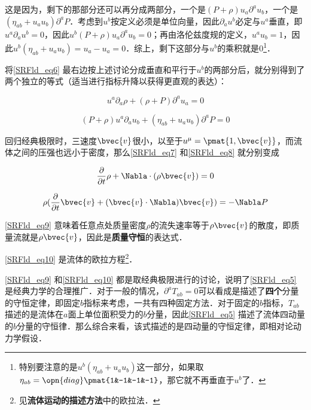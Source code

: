 这是因为，剩下的那部分还可以再分成两部分，一个是$(P+\rho)u_a\partial^au_b$，一个是$(\eta_{ab}+u_au_b)\partial^aP$．考虑到$u^b$按定义必须是单位向量，因此$\partial_au^b$必定与$u^a$垂直，即$u^a\partial_au^b=0$，因此$u^b(P+\rho)u_a\partial^au_b=0$；再由洛伦兹度规的定义，$u^au_b=1$，因此$u^b(\eta_{ab}+u_au_b)=u_a-u_a=0$．综上，剩下这部分与$u^b$的乘积就是$0$\footnote{特别要注意的是$u^b(\eta_{ab}+u_au_b)$这一部分，如果取$\eta_{ab}=\opn{diag}\pmat{1&-1&-1&-1}$，那它就不再垂直于$u^b$了．}．

将\autoref{SRFld_eq6} 最右边按上述讨论分成垂直和平行于$u^b$的两部分后，就分别得到了两个独立的等式（适当进行指标升降以获得更直观的表达）：

\begin{equation}\label{SRFld_eq7}
u^a\partial_a\rho+(\rho+P)\partial^au_a=0
\end{equation}

\begin{equation}\label{SRFld_eq8}
(P+\rho)u^a\partial_au_b+(\eta_{ab}+u_au_b)\partial^aP=0
\end{equation}

回归经典极限时，三速度$\bvec{v}$很小，以至于$u^\mu=\pmat{1, \bvec{v}}$，而流体之间的压强也远小于密度，那么\autoref{SRFld_eq7} 和\autoref{SRFld_eq8} 就分别变成

\begin{equation}\label{SRFld_eq9}
\frac{\partial}{\partial t}\rho+\Nabla\cdot(\rho\bvec{v})=0
\end{equation}

\begin{equation}\label{SRFld_eq10}
\rho(\frac{\partial}{\partial t}\bvec{v}+(\bvec{v}\cdot\Nabla)\bvec{v})=-\Nabla P
\end{equation}

\autoref{SRFld_eq9} 意味着任意点处质量密度$\rho$的流失速率等于$\rho\bvec{v}$的散度，即质量流就是$\rho\bvec{v}$，因此是\textbf{质量守恒}的表达式．

\autoref{SRFld_eq10} 是流体的欧拉方程\footnote{见\textbf{流体运动的描述方法}中的欧拉法．}．

\autoref{SRFld_eq9} 和\autoref{SRFld_eq10} 都是取经典极限进行的讨论，说明了\autoref{SRFld_eq5} 是经典力学的合理推广．对于一般的情况，$\partial^aT_{ab}=0$可以看成是描述了\textbf{四个}分量的守恒定律，即固定$b$指标来考虑，一共有四种固定方法．对于固定的$b$指标，$T_{ab}$描述的是流体在$a$面上单位面积受力的$b$分量，因此\autoref{SRFld_eq5} 描述了流体四动量的$b$分量的守恒律．那么综合来看，该式描述的是四动量的守恒定律，即相对论动力学假设．







